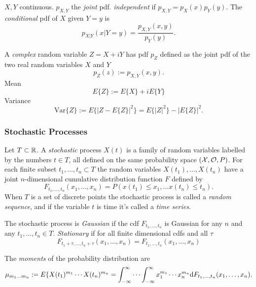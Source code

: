 $X,Y$ continuous. $p_{X,Y}$ the \textit{joint} pdf. \textit{independent} if $p_{X,Y}=p_X(x)p_Y(y)$. The \textit{conditional} pdf of $X$ given $Y=y$ is 
\begin{equation}
p_{X|Y}(x|Y=y)=\frac{p_{X,Y}(x,y)}{p_Y(y)}.
\end{equation}

A \textit{complex} random variable $Z=X+iY$ has pdf $p_Z$ defined as the joint pdf of the two real random variables $X$ and $Y$
\begin{equation}
p_Z(z):=p_{X,Y}(x,y).
\end{equation}
Mean
\begin{equation}
E\{Z\} := E\{X\}+ iE\{Y\}
\end{equation}
Variance 
\begin{equation}
\mbox{Var}\{Z\} := E\{ | Z - E\{Z\} |^2 \} = E\{|Z|^2\}-|E\{Z\}|^2.
\end{equation}

\subsubsection{Stochastic Processes}
Let $T\subset \mathbb{R}$. A \textit{stochastic} process $X(t)$ is a family of random variables labelled by the numbers $t\in T$, all defined on the same probability space $(\mathcal{X}, \mathcal{O}, P)$. For each finite subset ${t_1, \ldots, t_n} \subset T$ the random variables $ X(t_1), \ldots, X(t_n)$ have a joint $n$-dimensional cumulative distribution function $F$ defined by
\begin{equation}
F_{t_1, \ldots, t_n}(x_1,\ldots,x_n)=P(x(t_1)\leq x_1, \ldots x(t_n)\leq t_n).
\end{equation}
When $T$ is a set of discrete points the stochastic process is called a \textit{random sequence}, and if the variable $t$ is time it's called a \textit{time series}. 

The stochastic process is \textit{Gaussian} if the cdf $F_{t_1, \ldots, t_n}$ is Gaussian for any $n$ and any $t_1, \ldots, t_n \in T$. \textit{Stationary} if for all finite dimensional cdfs and all $\tau$
\begin{equation}
F_{t_1+\tau, \ldots, t_n+\tau}(x_1,\ldots,x_n)=F_{t_1, \ldots, t_n}(x_1,\ldots,x_n)
\end{equation}

The \textit{moments} of the probability distribution are 
\begin{equation}
\mu_{m_1 \ldots m_n} := E\{X(t_1)^{m_1}\cdots X(t_n)^{m_n} =\int_{-\infty}^{\infty}\cdots \int_{-\infty}^{\infty} x_1^{m_1}\cdots x_n^{m_n} {\mbox{d}} F_{t_1, \ldots, t_n}(x_1,\ldots,x_n).
\end{equation}



